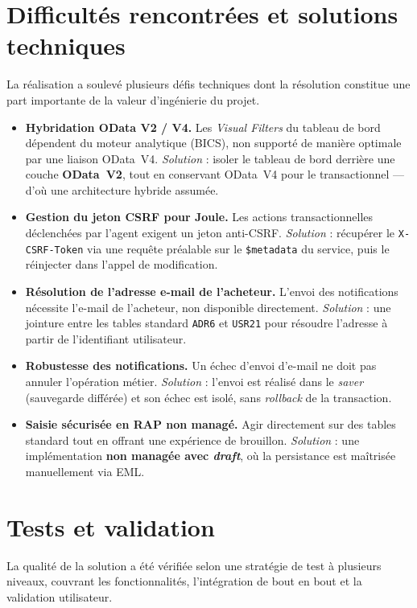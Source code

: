 \documentclass[12pt,a4paper,oneside]{report}
\begin{document}
\section{Difficultés rencontrées et solutions techniques}\label{ch5:difficultes}
La réalisation a soulevé plusieurs défis techniques dont la résolution constitue une part
importante de la valeur d'ingénierie du projet.

\begin{itemize}[label=\textbullet, itemsep=0.3em]
    \item \textbf{Hybridation OData V2 / V4.} Les \textit{Visual Filters} du tableau de bord
    dépendent du moteur analytique (BICS), non supporté de manière optimale par une liaison
    OData~V4. \textit{Solution} : isoler le tableau de bord derrière une couche
    \textbf{OData~V2}, tout en conservant OData~V4 pour le transactionnel --- d'où une
    architecture hybride assumée.
    \item \textbf{Gestion du jeton CSRF pour Joule.} Les actions transactionnelles déclenchées
    par l'agent exigent un jeton anti-CSRF. \textit{Solution} : récupérer le
    \texttt{X-CSRF-Token} via une requête préalable sur le \texttt{\$metadata} du service,
    puis le réinjecter dans l'appel de modification.
    \item \textbf{Résolution de l'adresse e-mail de l'acheteur.} L'envoi des notifications
    nécessite l'e-mail de l'acheteur, non disponible directement. \textit{Solution} : une
    jointure entre les tables standard \texttt{ADR6} et \texttt{USR21} pour résoudre
    l'adresse à partir de l'identifiant utilisateur.
    \item \textbf{Robustesse des notifications.} Un échec d'envoi d'e-mail ne doit pas
    annuler l'opération métier. \textit{Solution} : l'envoi est réalisé dans le
    \textit{saver} (sauvegarde différée) et son échec est isolé, sans \textit{rollback} de
    la transaction.
    \item \textbf{Saisie sécurisée en RAP non managé.} Agir directement sur des tables
    standard tout en offrant une expérience de brouillon. \textit{Solution} : une
    implémentation \textbf{non managée avec \textit{draft}}, où la persistance est maîtrisée
    manuellement via EML.
\end{itemize}

\section{Tests et validation}\label{ch5:tests}
La qualité de la solution a été vérifiée selon une stratégie de test à plusieurs niveaux,
couvrant les fonctionnalités, l'intégration de bout en bout et la validation utilisateur.
\end{document}
